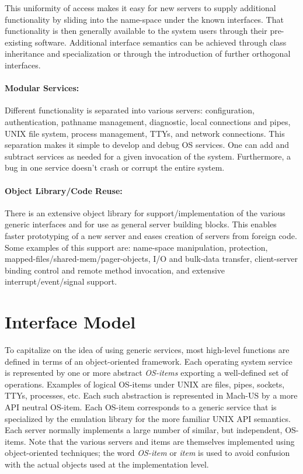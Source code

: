 This uniformity of access makes it easy for new servers to
supply additional functionality by sliding into the name-space under the
known interfaces.
That functionality is then
generally available to the system users through their
pre-existing software.  Additional interface semantics can be achieved
through class inheritance and specialization or through the introduction of
further orthogonal interfaces.

\paragraph{Modular Services:}
Different functionality is separated into various servers: 
configuration, authentication, pathname management, diagnostic,
local connections and pipes, UNIX file system, process management, TTYs,
and network connections.
This separation makes it simple to develop and debug OS services.
One can add and subtract
services as needed for a given invocation of the system.  Furthermore,
a bug in one service doesn't crash or corrupt the entire system.

\paragraph{Object Library/Code Reuse:}
There is an extensive object library for support/implementation of
the various generic interfaces and for use as general server building blocks.
This enables faster prototyping of a new server and eases creation of
servers from foreign code.  Some examples of this support are:
name-space manipulation, protection,
mapped-files/shared-mem/pager-objects, I/O and bulk-data transfer,
client-server binding control and remote method invocation,
and extensive interrupt/event/signal support.

\section{Interface Model}
To capitalize on the idea of using generic services, most high-level
functions are defined in terms of an object-oriented framework.  Each
operating system service is represented by one or more abstract {\em OS-items}
exporting a well-defined set of
operations.  Examples of logical OS-items under UNIX are files, pipes, sockets,
TTYs, processes, etc.  Each such abstraction is
represented in Mach-US by a more API neutral OS-item.  Each OS-item
corresponds to a
generic service that is specialized by the emulation library for the
more familiar UNIX API semantics.
Each server normally implements a large
number of similar, but independent, OS-items.  Note that the various
servers and items are themselves implemented using object-oriented
techniques; the word {\em OS-item} or {\em item}
is used to avoid confusion with the
actual objects used at the implementation level.

